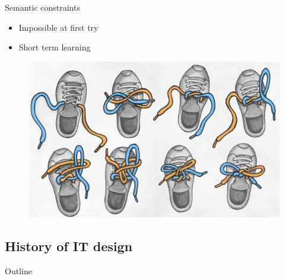 \documentclass{beamer}
\begin{document}
\begin{frame}{Semantic constraints}
    \begin{itemize}
    \item Impossible at first try
    \item Short term learning
    \end{itemize}
    \begin{figure}
    \includegraphics[scale=0.4]{tie_your_shoes.jpg}
    \end{figure}
\end{frame}

\subsection{History of IT design}

\begin{frame}{Outline}
    \tableofcontents[currentsection]
\end{frame}
\end{document}
